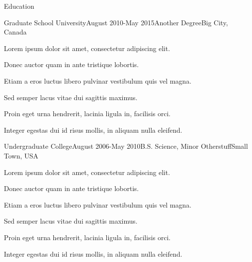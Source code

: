 \documentclass{resume}
\begin{document}
\begin{rSection}{Education}
\begin{rSubsection}{Graduate School University}{August 2010-May 2015}{Another Degree}{Big City, Canada}
\item Lorem ipsum dolor sit amet, consectetur adipiscing elit.
\item Donec auctor quam in ante tristique lobortis.
\item Etiam a eros luctus libero pulvinar vestibulum quis vel magna.
\item Sed semper lacus vitae dui sagittis maximus.
\item Proin eget urna hendrerit, lacinia ligula in, facilisis orci.
\item Integer egestas dui id risus mollis, in aliquam nulla eleifend.
\end{rSubsection}

\begin{rSubsection}{Undergraduate College}{August 2006-May 2010}{B.S. Science, Minor Otherstuff}{Small Town, USA}
\item Lorem ipsum dolor sit amet, consectetur adipiscing elit.
\item Donec auctor quam in ante tristique lobortis.
\item Etiam a eros luctus libero pulvinar vestibulum quis vel magna.
\item Sed semper lacus vitae dui sagittis maximus.
\item Proin eget urna hendrerit, lacinia ligula in, facilisis orci.
\item Integer egestas dui id risus mollis, in aliquam nulla eleifend.
\end{rSubsection}
\end{rSection}
  
\end{document}
